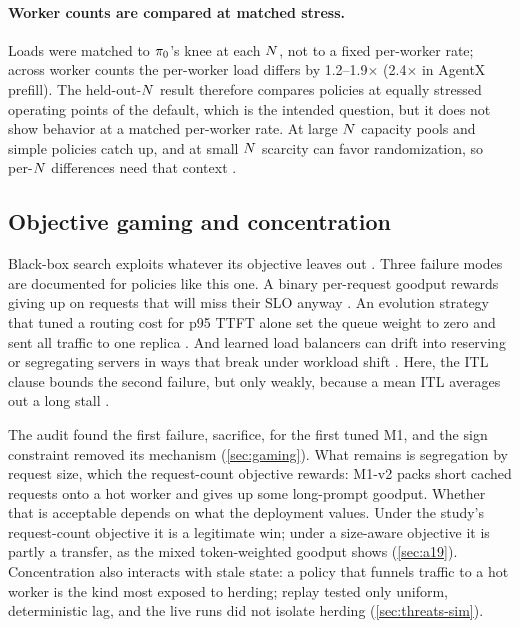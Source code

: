 \paragraph{Worker counts are compared at matched stress.}
Loads were matched to $\pi_{0}$'s knee at each $N$, not to a fixed per-worker rate; across worker
counts the per-worker load differs by 1.2--1.9$\times$ (2.4$\times$ in AgentX prefill). The
held-out-$N$ result therefore compares policies at equally stressed operating points of the
default, which is the intended question, but it does not show behavior at a matched per-worker
rate. At large $N$ capacity pools and simple policies catch up, and at small $N$ scarcity can
favor randomization, so per-$N$ differences need that context \citep{vanderboor2022survey,tumkur2026calibrate}.

\subsection{Objective gaming and concentration}
\label{sec:threats-gaming}

Black-box search exploits whatever its objective leaves out \citep{lehman2020creativity}. Three
failure modes are documented for policies like this one. A binary per-request goodput rewards
giving up on requests that will miss their SLO anyway \citep{wang2024slo}. An evolution strategy
that tuned a routing cost for p95 TTFT alone set the queue weight to zero and sent all traffic to
one replica \citep{toniolo2026gorgo}. And learned load balancers can drift into reserving or
segregating servers in ways that break under workload shift \citep{mao2019park}. Here, the ITL
clause bounds the second failure, but only weakly, because a mean ITL averages out a long stall
\citep{wang2024slo}.

The audit found the first failure, sacrifice, for the first tuned M1, and the sign constraint
removed its mechanism (\cref{sec:gaming}). What remains is segregation by request size, which the
request-count objective rewards: M1-v2 packs short cached requests onto a hot worker and gives up some
long-prompt goodput. Whether that is acceptable depends on what the deployment values. Under the
study's request-count objective it is a legitimate win; under a size-aware objective it is partly a
transfer, as the mixed token-weighted goodput shows (\cref{sec:a19}). Concentration also interacts with stale
state: a policy that funnels traffic to a hot worker is the kind most exposed to herding; replay
tested only uniform, deterministic lag, and the live runs did not isolate herding
(\cref{sec:threats-sim}).

